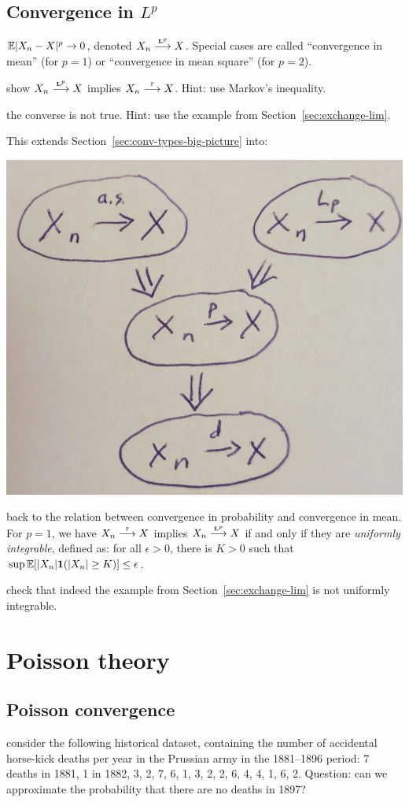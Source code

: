 \documentclass{article}
\begin{document}
\subsection{Convergence in $L^p$}

 ${\mathbb E} |X_n - X|^p \to 0$, denoted $X_n \stackrel{\scriptscriptstyle\mathbf L^p}{\longrightarrow} X$. Special cases are called ``convergence in mean'' (for $p=1$) or ``convergence in mean square'' (for $p=2$).

 show $X_n \stackrel{\scriptscriptstyle\mathbf L^p}{\longrightarrow} X$ implies $X_n \stackrel{\scriptscriptstyle {\mathbb P}}{\longrightarrow} X$. Hint: use Markov's inequality.

 the converse is not true. Hint: use the example from Section~\ref{sec:exchange-lim}. 

 This extends Section~\ref{sec:conv-types-big-picture} into:
\begin{center}
	\includegraphics[width=0.5\linewidth]{figures/types-of-conv} 
\end{center}

 back to the relation between convergence in probability and convergence in mean. For $p=1$, we have $X_n \stackrel{\scriptscriptstyle {\mathbb P}}{\longrightarrow} X$ implies $X_n \stackrel{\scriptscriptstyle\mathbf L^p}{\longrightarrow} X$ if and only if they are \emph{uniformly integrable}, defined as: for all $\epsilon > 0$, there is $K > 0$ such that $\sup {\mathbb E}[|X_n| {\mathbf 1}(|X_n| \ge K)] \le \epsilon$. 

 check that indeed the example from Section~\ref{sec:exchange-lim} is not uniformly integrable.


\section{Poisson theory}

\subsection{Poisson convergence}

 consider the following historical dataset, containing the number of accidental horse-kick deaths per year in the Prussian army in the 1881--1896 period: 7 deaths in 1881, 1 in 1882, 3, 2, 7, 6, 1, 3, 2, 2, 6, 4, 4, 1, 6, 2. Question: can we approximate the probability that there are no deaths in 1897?
\end{document}
